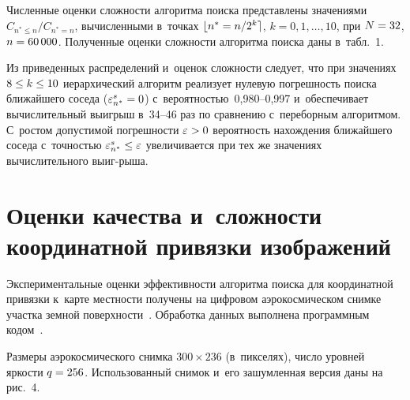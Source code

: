 \begin{multicols}{2}
  
 
  Численные оценки сложности алгоритма поиска представлены значениями 
$C_{n^*\leq n}/C_{n^*=n}$, вы\-чис\-лен\-ны\-ми в~точках $\lfloor n^*\hm= n/2^k \rceil$, 
$k=0,1,\ldots ,10$, при $N\hm=32$, $n\hm=60\,000$. Полученные оценки 
сложности алгоритма поиска даны в~табл.~1.
  

  
  Из приведенных распределений и~оценок сложности следует, что при 
значениях $8\hm\leq k\hm\leq 10$ иерархический алгоритм реализует 
нулевую погрешность поиска ближайшего соседа ($\varepsilon^s_{n^*}\hm=0$) 
с~вероятностью~0,980--0,997 и~обеспечивает вы\-чис\-ли\-тель\-ный выигрыш  
в~34--46 раз по сравнению с~переборным алгоритмом. 
С~ростом допустимой 
погрешности $\varepsilon\hm>0$ вероятность нахождения ближайшего соседа 
с~точ\-ностью $\varepsilon^s_{n^*}\hm\leq\varepsilon$ увеличивается при тех же 
значениях вычислительного вы\-иг-\linebreak рыша. 

\columnbreak

{ %

}
  
  \section{Оценки качества и~сложности координатной привязки 
изображений}

\vspace*{-12pt}
  
  Экспериментальные оценки эффективности алгоритма поиска для 
координатной привязки к~карте местности получены на цифровом 
аэрокосмическом снимке участка земной поверхности~\cite{13-lan}. Обработка 
данных выполнена программным кодом~\cite{15-lan}.
  
  

  
  Размеры аэрокосмического снимка $300\times 236$ (в~пикселях), число 
уровней яркости $q\hm=256$. Использованный снимок и~его зашумленная 
версия даны на рис.~4. 



\pagebreak

\end{multicols}

\setcounter{figure}{4}
  
  \begin{figure*} %
  \vspace*{1pt}
\begin{center}
\mbox{%
\epsfxsize=156.651mm
}
\end{center}
\vspace*{-8pt}
\vspace*{9pt}
\end{figure*}



